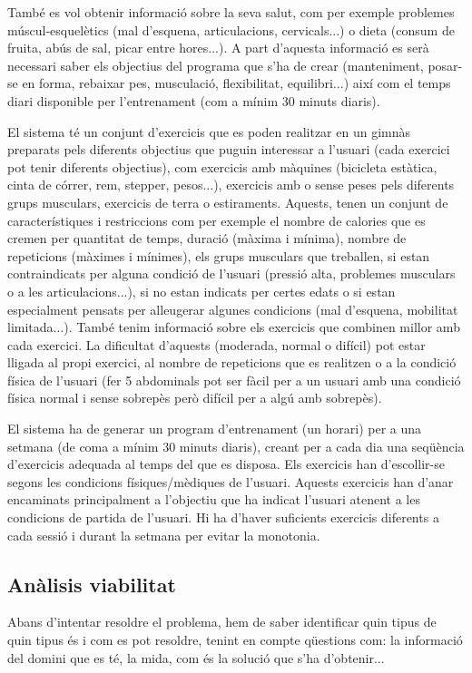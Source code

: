 \documentclass[a4paper, 12pt, UTF8]{article}
\begin{document}
També es vol obtenir informació sobre la seva salut, com per exemple problemes múscul-esquelètics (mal d'esquena, articulacions, cervicals...) o dieta (consum de fruita, abús de sal, picar entre hores...). 
A part d'aquesta informació es serà necessari saber els objectius del programa que s'ha de crear (manteniment, posar-se en forma, rebaixar pes, musculació, flexibilitat, equilibri...) així com el temps diari disponible per l'entrenament (com a mínim 30 minuts diaris).
 
El sistema té un conjunt d'exercicis que es poden realitzar en un gimnàs preparats pels diferents objectius que puguin interessar a l'usuari (cada exercici pot tenir diferents objectius), com exercicis amb màquines (bicicleta estàtica, cinta de córrer, rem, stepper, pesos...), exercicis amb o sense peses pels diferents grups musculars, exercicis de terra o estiraments.
Aquests, tenen un conjunt de característiques i restriccions com per exemple el nombre de calories que es cremen per quantitat de temps, duració (màxima i mínima), nombre de repeticions (màximes i mínimes), els grups musculars que treballen, si estan contraindicats per alguna condició de l'usuari (pressió alta, problemes musculars o a les articulacions...), si no estan indicats per certes edats o si estan especialment pensats per alleugerar algunes condicions (mal d'esquena, mobilitat limitada...). També tenim informació sobre els exercicis que combinen millor amb cada exercici. La dificultat d'aquests (moderada, normal o difícil) pot estar lligada al propi exercici, al nombre de repeticions que es realitzen o a la condició física de l'usuari (fer 5 abdominals pot ser fàcil per a un usuari amb una condició física normal i sense sobrepès però difícil per a algú amb sobrepès).

El sistema ha de generar un program d'entrenament (un horari) per a una setmana (de coma a mínim 30 minuts diaris), creant per a cada dia una seqüència d'exercicis adequada al temps del que es disposa. Els exercicis han d'escollir-se segons les condicions físiques/mèdiques de l'usuari. Aquests exercicis han d'anar encaminats principalment a l'objectiu que ha indicat l'usuari atenent a les condicions de partida de l'usuari. Hi ha d'haver suficients exercicis diferents a cada sessió i durant la setmana per evitar la monotonia. 

\subsection{Anàlisis viabilitat}
Abans d'intentar resoldre el problema, hem de saber identificar quin tipus de quin tipus és i com es pot resoldre, tenint en compte qüestions com: la informació del domini que es té, la mida, com és la solució que s'ha d'obtenir...
\end{document}
